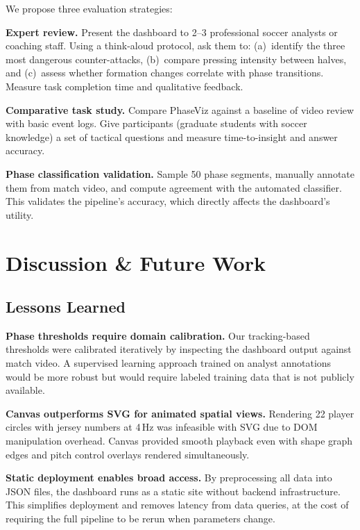 \documentclass{vgtc}                          %
\begin{document}
We propose three evaluation strategies:

\textbf{Expert review.} Present the dashboard to 2--3 professional soccer analysts or coaching staff. Using a think-aloud protocol, ask them to: (a)~identify the three most dangerous counter-attacks, (b)~compare pressing intensity between halves, and (c)~assess whether formation changes correlate with phase transitions. Measure task completion time and qualitative feedback.

\textbf{Comparative task study.} Compare PhaseViz against a baseline of video review with basic event logs. Give participants (graduate students with soccer knowledge) a set of tactical questions and measure time-to-insight and answer accuracy.

\textbf{Phase classification validation.} Sample 50 phase segments, manually annotate them from match video, and compute agreement with the automated classifier. This validates the pipeline's accuracy, which directly affects the dashboard's utility.

\section{Discussion \& Future Work}

\subsection{Lessons Learned}

\textbf{Phase thresholds require domain calibration.} Our tracking-based thresholds were calibrated iteratively by inspecting the dashboard output against match video. A supervised learning approach trained on analyst annotations would be more robust but would require labeled training data that is not publicly available.

\textbf{Canvas outperforms SVG for animated spatial views.} Rendering 22 player circles with jersey numbers at 4\,Hz was infeasible with SVG due to DOM manipulation overhead. Canvas provided smooth playback even with shape graph edges and pitch control overlays rendered simultaneously.

\textbf{Static deployment enables broad access.} By preprocessing all data into JSON files, the dashboard runs as a static site without backend infrastructure. This simplifies deployment and removes latency from data queries, at the cost of requiring the full pipeline to be rerun when parameters change.
\end{document}
